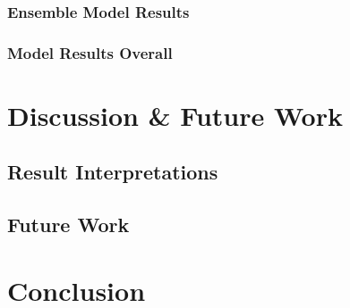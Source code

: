 \documentclass[10pt,sigconf,letterpaper,nonacm]{acmart}
\begin{document}
\subsubsection{Ensemble Model Results}

\subsubsection{Model Results Overall}


\section{Discussion \& Future Work}

\subsection{Result Interpretations}

\subsection{Future Work}


\section{Conclusion}





\nocite{*}

\end{document}
